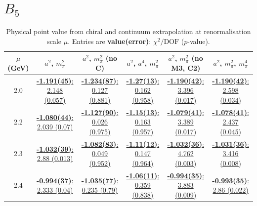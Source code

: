 \documentclass[12pt]{extarticle}
\begin{document}
\section{$B_5$}
\begin{table}[h!]
\begin{center}
\begin{tabular}{|c|c|c|c|c|c|}
\hline
$\mu$ (GeV) & $a^2$, $m_\pi^2$& $a^2$, $m_\pi^2$ (no C)& $a^2$, $a^4$, $m_\pi^2$& $a^2$, $m_\pi^2$ (no M3, C2)& $a^2$, $m_\pi^2$, $m_\pi^4$\\
\hline
2.0& \hyperlink{TT/SUSY/a2m2_20.pdf.1}{\textbf{-1.191(45)}: 2.148 (0.057)} & \hyperlink{TT/SUSY/a2m2noC_20.pdf.1}{\textbf{-1.234(87)}: 0.127 (0.881)} & \hyperlink{TT/SUSY/a2a4m2_20.pdf.1}{\textbf{-1.27(13)}: 0.162 (0.958)} & \hyperlink{TT/SUSY/a2m2mcut_20.pdf.1}{\textbf{-1.190(42)}: 3.396 (0.017)} & \hyperlink{TT/SUSY/a2m2m4_20.pdf.1}{\textbf{-1.190(42)}: 2.598 (0.034)}\\
2.2& \hyperlink{TT/SUSY/a2m2_22.pdf.1}{\textbf{-1.080(44)}: 2.039 (0.07)} & \hyperlink{TT/SUSY/a2m2noC_22.pdf.1}{\textbf{-1.127(90)}: 0.026 (0.975)} & \hyperlink{TT/SUSY/a2a4m2_22.pdf.1}{\textbf{-1.15(13)}: 0.163 (0.957)} & \hyperlink{TT/SUSY/a2m2mcut_22.pdf.1}{\textbf{-1.079(41)}: 3.389 (0.017)} & \hyperlink{TT/SUSY/a2m2m4_22.pdf.1}{\textbf{-1.078(41)}: 2.437 (0.045)}\\
2.3& \hyperlink{TT/SUSY/a2m2_23.pdf.1}{\textbf{-1.032(39)}: 2.88 (0.013)} & \hyperlink{TT/SUSY/a2m2noC_23.pdf.1}{\textbf{-1.082(83)}: 0.049 (0.952)} & \hyperlink{TT/SUSY/a2a4m2_23.pdf.1}{\textbf{-1.11(12)}: 0.147 (0.964)} & \hyperlink{TT/SUSY/a2m2mcut_23.pdf.1}{\textbf{-1.032(36)}: 4.762 (0.003)} & \hyperlink{TT/SUSY/a2m2m4_23.pdf.1}{\textbf{-1.031(36)}: 3.416 (0.008)}\\
2.4& \hyperlink{TT/SUSY/a2m2_24.pdf.1}{\textbf{-0.994(37)}: 2.333 (0.04)} & \hyperlink{TT/SUSY/a2m2noC_24.pdf.1}{\textbf{-1.035(77)}: 0.235 (0.79)} & \hyperlink{TT/SUSY/a2a4m2_24.pdf.1}{\textbf{-1.06(11)}: 0.359 (0.838)} & \hyperlink{TT/SUSY/a2m2mcut_24.pdf.1}{\textbf{-0.994(35)}: 3.883 (0.009)} & \hyperlink{TT/SUSY/a2m2m4_24.pdf.1}{\textbf{-0.993(35)}: 2.86 (0.022)}\\
\hline
\end{tabular}
\caption{Physical point value from chiral and continuum extrapolation at renormalisation scale $\mu$. Entries are \textbf{value(error)}: $\chi^2/\text{DOF}$ ($p$-value).}
\end{center}
\end{table}
\end{document}
